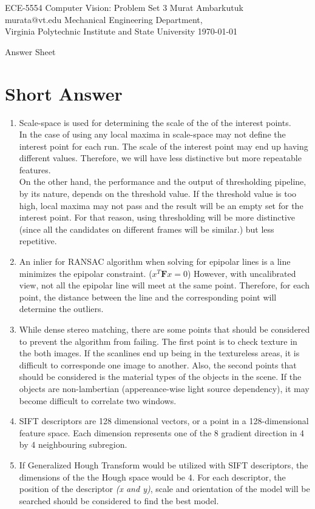 \documentclass{article}
\begin{document}
\label{Cover}
	\begin{center}
	\large{ECE-5554 Computer Vision: Problem Set 3} 
	\vfill
	Murat Ambarkutuk \\ murata@vt.edu
	\vfill
	Mechanical Engineering Department,\\ Virginia Polytechnic Institute and State University
	\vfill
	\today
	\end{center}
\pagebreak 
\large{Answer Sheet}
\label{Short Answer}
\section{Short Answer}
\begin{enumerate}
	\item Scale-space is used for determining the scale of the of the
	interest points. \\ 
	In the case of using any local maxima in scale-space may not define the
	interest point for each run. The scale of the interest point may end up having
	different values. Therefore, we will have less distinctive but
	more repeatable features. \\
	On the other hand, the performance and the output of thresholding pipeline, by
	its nature, depends on the threshold value. If the threshold value is too high,
	local maxima may not pass and the result will be an empty set for the interest
	point. For that reason, using thresholding will be more distinctive (since all
	the candidates on different frames will be similar.) but less repetitive.
	\item An inlier for RANSAC algorithm when solving for epipolar lines is a
	line minimizes the epipolar constraint. ($x^T\mathbf{F}x = 0$) However, with
	uncalibrated view, not all the epipolar line will meet at the same point.
	Therefore, for each point, the distance between the line and the
	corresponding point will determine the outliers.
	\item While dense stereo matching, there are some points that should
	be considered to prevent the algorithm from failing. The first point is to
	check texture in the both images. If the scanlines end up being in the
	textureless areas, it is difficult to corresponde one image to another.
	Also, the second points that should be considered is the material types of the
	objects in the scene. If the objects are non-lambertian (appereance-wise light
	source dependency), it may become difficult to correlate two windows.
	 
	\item SIFT descriptors are 128 dimensional vectors, or a point in a
	128-dimensional feature space. Each dimension represents one of the 8
	gradient direction in 4 by 4 neighbouring subregion.
	\item If Generalized Hough Transform would be utilized with SIFT descriptors,
	the dimensions of the the Hough space would be 4. For each descriptor, the
	position of the descriptor \textit{(x and y)}, scale and orientation of the
	model will be searched should be considered to find the best model.
\end{enumerate}
\end{document}
